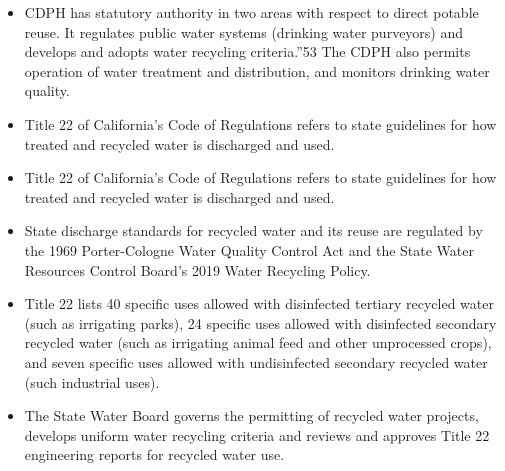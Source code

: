 \documentclass{article}
\begin{document}
\begin{enumerate}
\begin{itemize}
\item CDPH has statutory authority in two areas with respect to direct potable reuse. It 
regulates public water systems (drinking water purveyors) and develops and adopts water 
recycling criteria.”53 The CDPH also permits operation of water treatment and distribution, and 
monitors drinking water quality.\\

\item Title 22 of California’s Code of Regulations refers to state guidelines for how treated and recycled water is discharged and used.\\

\item Title 22 of California’s Code of Regulations refers to state guidelines for how treated and recycled water is discharged and used.\\

\item State discharge standards for recycled water and its reuse are regulated by the 1969 Porter-Cologne Water Quality Control Act and the State Water Resources Control Board’s 2019 Water Recycling Policy.\\

\item Title 22 lists 40 specific uses allowed with disinfected tertiary recycled water (such as irrigating parks), 24 specific uses allowed with disinfected secondary recycled water (such as irrigating animal feed and other unprocessed crops), and seven specific uses allowed with undisinfected secondary recycled water (such industrial uses).\\

\item The State Water Board governs the permitting of recycled water projects, develops uniform water recycling criteria and reviews and approves Title 22 engineering reports for recycled water use.\\
\end{itemize}

\end{enumerate}
\end{document}
